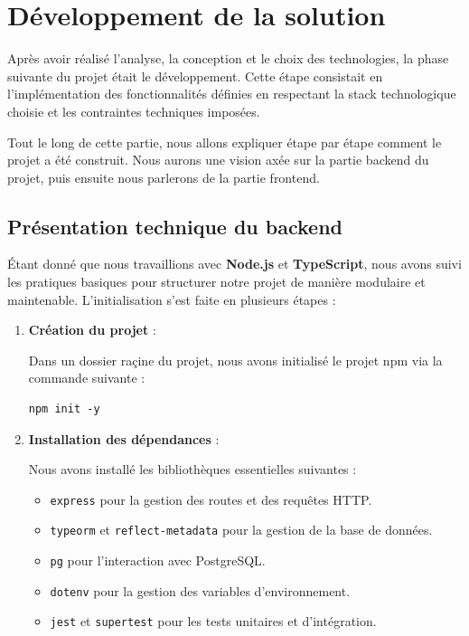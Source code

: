 {\section{Développement de la solution} \label{developement_solution}

Après avoir réalisé l’analyse, la conception et le choix des technologies, la phase suivante du projet était le développement. Cette étape consistait en l’implémentation des fonctionnalités définies en respectant la stack technologique choisie et les contraintes techniques imposées.

\vspace{0.35cm}

Tout le long de cette partie, nous allons expliquer étape par étape comment le projet a été construit. Nous  aurons une vision axée sur la partie backend du projet, puis ensuite nous parlerons de la partie frontend.

\subsection*{Présentation technique du backend} \label{architecture_backend}

Étant donné que nous travaillions avec \textbf{Node.js} et \textbf{TypeScript}, nous avons suivi les pratiques basiques pour structurer notre projet de manière modulaire et maintenable. L’initialisation s’est faite en plusieurs étapes :

\begin{enumerate}
    \item \textbf{Création du projet} : 
    
    Dans un dossier raçine du projet, nous avons initialisé le projet npm via la commande suivante : 

    \begin{verbatim}
npm init -y
    \end{verbatim}
    
    \item \textbf{Installation des dépendances} : 
    
    Nous avons installé les bibliothèques essentielles suivantes :
    \begin{itemize}
        \item \texttt{express} pour la gestion des routes et des requêtes HTTP.
        \item \texttt{typeorm} et \texttt{reflect-metadata} pour la gestion de la base de données.
        \item \texttt{pg} pour l’interaction avec PostgreSQL.
        \item \texttt{dotenv} pour la gestion des variables d’environnement.
        \item \texttt{jest} et \texttt{supertest} pour les tests unitaires et d’intégration.
    \end{itemize}


\end{enumerate}}
